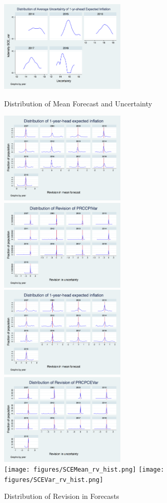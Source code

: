 \documentclass[]{article}
\begin{document}
\begin{figure}[h]
	\includegraphics[width=6cm]{figures/SCEvar_hist.png}  \\
	\caption{Distribution of Mean Forecast and Uncertainty }
\end{figure}


\begin{figure}[h]\label{RevisionHist}
	\centering
	\includegraphics[width=6cm]{figures/PRCCPIMean_rv_hist.png} 
	\includegraphics[width=6cm]{figures/PRCCPIVar_rv_hist.png}  \\
	\smallskip
	\includegraphics[width=6cm]{figures/PRCPCEMean_rv_hist.png} 
	\includegraphics[width=6cm]{figures/PRCPCEVar_rv_hist.png}  \\
	\smallskip
		\texttt{[image: figures/SCEMean\_rv\_hist.png]} 
	\texttt{[image: figures/SCEVar\_rv\_hist.png]}  \\
	\caption{Distribution of Revision in Forecasts}
\end{figure}
\end{document}
